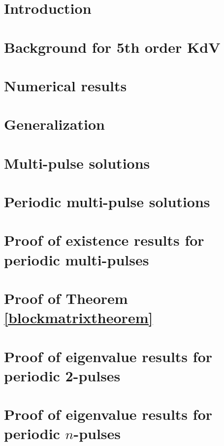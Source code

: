 \documentclass[11pt,reqno,oneside]{amsbook}
\theoremstyle{plain}
\theoremstyle{definition}
\theoremstyle{remark}
\numberwithin{section}{chapter}
\numberwithin{equation}{chapter}
\begin{document}
\mainmatter

\chapter{Introduction}

\chapter{Background for 5th order KdV}\label{chapter:KdV5}


\chapter{Numerical results}\label{chapter:KdV5}


\chapter{Generalization}\label{chapter:kdv5general}



\chapter{Multi-pulse solutions}\label{chapter:kdv5homoclinic}


\chapter{Periodic multi-pulse solutions }\label{chapter:kdv5periodic}


\chapter{Proof of existence results for periodic multi-pulses}


\chapter{Proof of Theorem \ref{blockmatrixtheorem}}



\chapter{Proof of eigenvalue results for periodic 2-pulses}


\chapter{Proof of eigenvalue results for periodic $n$-pulses}

\end{document}
